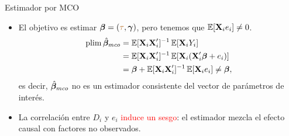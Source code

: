 \documentclass[10pt, xcolor=dvipsnames]{beamer}
\begin{document}
\begin{frame}{Estimador por MCO}
\begin{itemize}
    \item El objetivo es estimar $\boldsymbol{\beta} = (\textcolor{brown}{\tau}, \boldsymbol{\gamma})$, pero tenemos que $\operatorname{\mathbb{E}}[\textbf{X}_i e_i] \neq 0$. %
    \smallspace     
    \begin{align*}
    \begin{split}
        \plim \hat \betaB_{mco} &= \EX[\XB_i\XB'_i]^{-1} \EX[\XB_iY_i] \\ 
        &= \EX[\XB_i\XB'_i]^{-1} \EX[\XB_i (\XB'_i \betaB + e_i)] \\        
        &= \betaB + \EX[\XB_i\XB'_i]^{-1} \EX[\XB_i e_i] \neq \betaB,
    \end{split}        
    \end{align*}
    es decir, \(\hat {\boldsymbol{\beta}}_{mco}\) no es un estimador consistente del vector de parámetros de interés. %
    \smallspace
    \item La correlación entre $D_i$ y $e_i$ \textcolor{red}{induce un sesgo}: el estimador mezcla el efecto causal con factores no observados.
\end{itemize}    
\end{frame}
\end{document}
